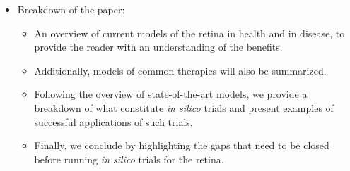 \documentclass[12pt,a4paper]{article}
\begin{document}
\begin{itemize}
\item Breakdown of the paper:
  \begin{itemize}
  \item An overview of current models of the retina in health and in disease, to provide the reader with an understanding of the benefits.
  \item Additionally, models of common therapies will also be summarized.
  \item Following the overview of state-of-the-art models, we provide a breakdown of what constitute \textit{in silico} trials and present examples of successful applications of such trials.
  \item Finally, we conclude by highlighting the gaps that need to be closed before running \textit{in silico} trials for the retina.
  \end{itemize}
\end{itemize}


\end{document}
